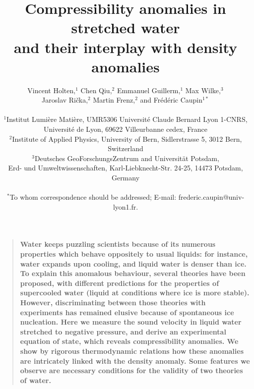 \documentclass[12pt]{article}
\title{Compressibility anomalies in stretched water\\
and their interplay with density anomalies}
\author
{Vincent Holten,$^{1}$ Chen Qiu,$^{2}$ Emmanuel Guillerm,$^{1}$ Max Wilke,$^{3}$\\
Jaroslav Ri\v{c}ka,$^{2}$ Martin Frenz,$^{2}$ and Fr\'ed\'eric Caupin$^{1\ast}$\\
\\
\normalsize{$^{1}$Institut Lumi\`ere Mati\`ere, UMR5306 Universit\'e Claude Bernard Lyon
1-CNRS,}\\
\normalsize{Universit\'e de Lyon, 69622
Villeurbanne cedex, France}\\
\normalsize{$^{2}$Institute of Applied Physics, University of Bern, Sidlerstrasse 5, 3012
Bern, Switzerland}\\
\normalsize{$^{3}$Deutsches GeoForschungsZentrum and Universit\"{a}t Potsdam,}\\
\normalsize{Erd- und Umweltwissenschaften, Karl-Liebknecht-Str. 24-25, 14473 Potsdam, Germany}\\
\\
\normalsize{$^\ast$To whom correspondence should be addressed; E-mail:  frederic.caupin@univ-lyon1.fr.}
}
\date{}
\newenvironment{sciabstract}{%
\begin{quote} \bf}
{\end{quote}}
\begin{document}
 




\maketitle 


%

\begin{sciabstract}
Water keeps puzzling scientists because of its numerous properties which behave oppositely to usual liquids: for instance, water expands upon cooling, and liquid water is denser than ice. To explain this anomalous behaviour, several theories have been proposed, with different predictions for the properties of supercooled water (liquid at conditions where ice is more stable). However, discriminating between those theories with experiments has remained elusive because of spontaneous ice nucleation. Here we measure the sound velocity in liquid water stretched to negative pressure, and derive an experimental equation of state, which reveals compressibility anomalies. We show by rigorous thermodynamic relations how these anomalies are intricately linked with the density anomaly. Some features we observe are necessary conditions for the validity of two theories of water.
\end{sciabstract}



\end{document}
